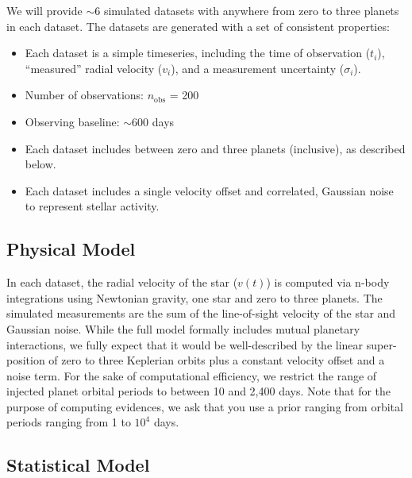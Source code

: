 \documentclass{article}
\begin{document}
We will provide $\sim$6 simulated datasets with anywhere from zero to three planets in each dataset. 
The datasets are generated with a set of consistent properties:
\begin{itemize}
\item Each dataset is a simple timeseries, including the time of observation ($t_i$), ``measured'' radial velocity ($v_i$), and a measurement uncertainty ($\sigma_i$).  
\item Number of observations: $n_{\mathrm{obs}}$ = 200
\item Observing baseline: $\sim$600 days
\item Each dataset includes between zero and three planets (inclusive), as described below.  
\item Each dataset includes a single velocity offset and correlated, Gaussian noise to represent stellar activity.  
\end{itemize}

\subsection{Physical Model}
%
In each dataset, the radial velocity of the star ($v(t)$) is computed via n-body integrations using Newtonian gravity, one star and zero to three planets.
The simulated measurements are the sum of the line-of-sight velocity of the star and Gaussian noise.
While the full model formally includes mutual planetary interactions, we fully expect that it would be well-described by the linear super-position of zero to three Keplerian orbits plus a constant velocity offset and a noise term.
For the sake of computational efficiency, we restrict the range of injected planet orbital periods to between 10 and 2,400 days.  Note that for the purpose of computing evidences, we ask that you use a prior ranging from orbital periods ranging from 1 to $10^4$ days.

\subsection{Statistical Model}
\end{document}
